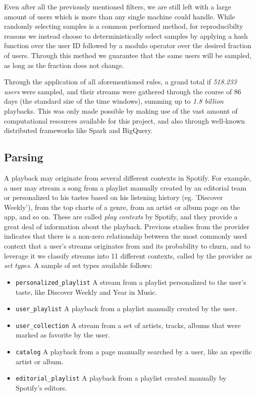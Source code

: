 \documentclass{kththesis}
\begin{document}
Even after all the previously mentioned filters, we are still left with a large amount of users which is more than any single machine could handle. While randomly selecting samples is a common performed method, for reproducibilty reasons we instead choose to deterministically select samples by applying a hash function over the user ID followed by a modulo operator over the desired fraction of users. Through this method we guarantee that the same users will be sampled, as long as the fraction does not change.

Through the application of all aforementioned rules, a grand total if \emph{518.233 users} were sampled, and their streams were gathered through the course of 86 days (the standard size of the time windows), summing up to \emph{1.8 billion} playbacks. This was only made possible by making use of the vast amount of computational resources available for this project, and also through well-known distributed frameworks like Spark and BigQuery. 

\subsection{Parsing}

A playback may originate from several different contexts in Spotify. For example, a user may stream a song from a playlist manually created by an editorial team or personalized to his tastes based on his listening history (eg. 'Discover Weekly'), from the top charts of a genre, from an artist or album page on the app, and so on. These are called \emph{play contexts} by Spotify, and they provide a great deal of information about the playback. Previous studies from the provider indicates that there is a non-zero relationship between the most commonly used context that a user's streams originates from and its probability to churn, and to leverage it we classify streams into 11 different contexts, called by the provider as \emph{set types}. A sample of set types available follows:

\begin{itemize}
  \item \verb|personalized_playlist| A stream from a playlist personalized to the user's taste, like Discover Weekly and Year in Music.	
  \item \verb|user_playlist| A playback from a playlist manually created by the user.
  \item \verb|user_collection| A stream from a set of artists, tracks, albums that were marked as favorite by the user.
  \item \verb|catalog| A playback from a page manually searched by a user, like an specific artist or album.
   \item \verb|editorial_playlist| A playback from a playlist created manually by Spotify's editors.
\end{itemize}
\end{document}
